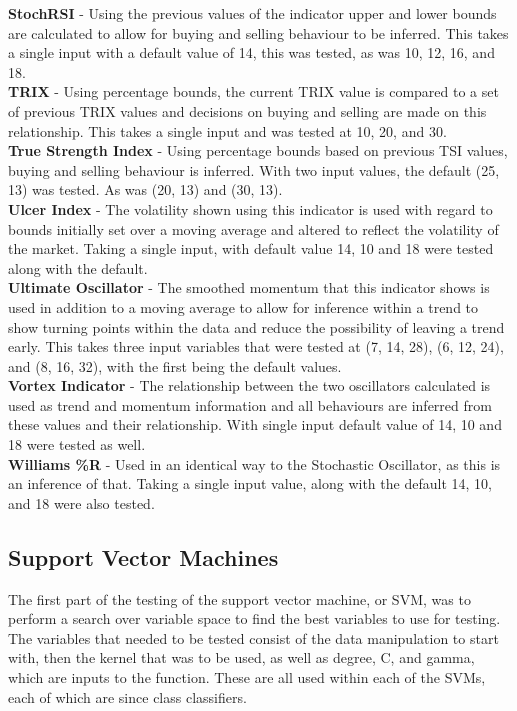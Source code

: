 \documentclass[conference]{IEEEtran}
\begin{document}
\textbf{StochRSI} - Using the previous values of the indicator upper and lower bounds are calculated to allow for buying and selling behaviour to be inferred. This takes a single input with a default value of 14, this was tested, as was 10, 12, 16, and 18. \\
\textbf{TRIX} - Using percentage bounds, the current TRIX value is compared to a set of previous TRIX values and decisions on buying and selling are made on this relationship. This takes a single input and was tested at 10, 20, and 30. \\
\textbf{True Strength Index} - Using percentage bounds based on previous TSI values, buying and selling behaviour is inferred. With two input values, the default (25, 13) was tested. As was (20, 13) and (30, 13).\\
\textbf{Ulcer Index} - The volatility shown using this indicator is used with regard to bounds initially set over a moving average and altered to reflect the volatility of the market. Taking a single input, with default value 14, 10 and 18 were tested along with the default.\\
\textbf{Ultimate Oscillator} - The smoothed momentum that this indicator shows is used in addition to a moving average to allow for inference within a trend to show turning points within the data and reduce the possibility of leaving a trend early. This takes three input variables that were tested at (7, 14, 28), (6, 12, 24), and (8, 16, 32), with the first being the default values.\\
\textbf{Vortex Indicator} - The relationship between the two oscillators calculated is used as trend and momentum information and all behaviours are inferred from these values and their relationship. With single input default value of 14, 10 and 18 were tested as well.\\
\textbf{Williams \%R} - Used in an identical way to the Stochastic Oscillator, as this is an inference of that. Taking a single input value, along with the default 14, 10, and 18 were also tested.\\

\subsection{Support Vector Machines}

The first part of the testing of the support vector machine, or SVM, was to perform a search over variable space to find the best variables to use for testing. The variables that needed to be tested consist of the data manipulation to start with, then the kernel that was to be used, as well as degree, C, and gamma, which are inputs to the function. These are all used within each of the SVMs, each of which are since class classifiers. 
\end{document}
